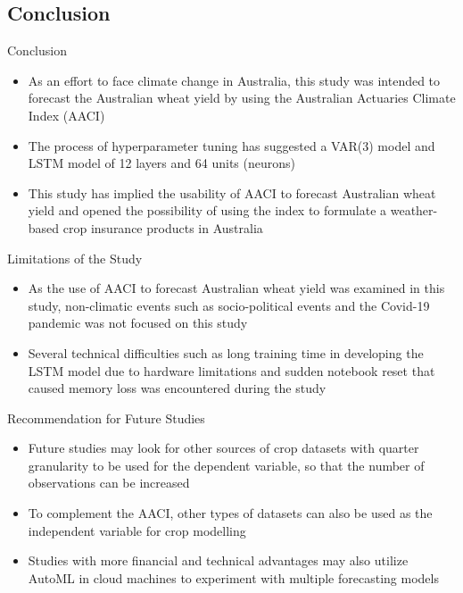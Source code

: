 \documentclass[aspectratio=169]{beamer}
\begin{document}
\subsection{Conclusion}
\begin{frame}{Conclusion}
\begin{itemize}
    \item As an effort to face climate change in Australia, this study was intended to forecast the Australian wheat yield by using the Australian Actuaries Climate Index (AACI)
    \item The process of hyperparameter tuning has suggested a VAR(3) model and LSTM model of 12 layers and 64 units (neurons)
    \item This study has implied the usability of AACI to forecast Australian wheat yield and opened the possibility of using the index to formulate a weather-based crop insurance products in Australia
\end{itemize}
\end{frame}

\begin{frame}{Limitations of the Study}
    \begin{itemize}
        \item As the use of AACI to forecast Australian wheat yield was examined in this study, non-climatic events such as socio-political events and the Covid-19 pandemic was not focused on this study
        \item Several technical difficulties such as long
        training time in developing the LSTM model due to hardware limitations and sudden notebook reset that caused memory loss was encountered during the study
    \end{itemize}
\end{frame}

\begin{frame}{Recommendation for Future Studies}
    \begin{itemize}
        \item Future studies may look for other sources of crop datasets with quarter granularity to be used for the dependent variable, so that the number of observations can be increased
        \item To complement the AACI, other types of datasets can also be used as the independent
        variable for crop modelling
        \item Studies with more financial and technical advantages may also utilize AutoML in cloud machines to experiment with multiple forecasting models
    \end{itemize}   
\end{frame}
\end{document}
